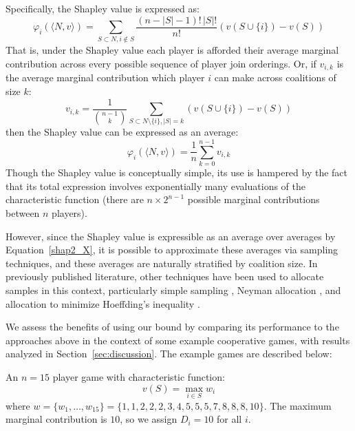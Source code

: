 Specifically, the Shapley value is expressed as:
\begin{equation}\label{shap1_X}\varphi_i(\langle N,v\rangle) = \sum_{S\subset N, i\notin S}\frac{(n-|S|-1)!\,|S|!}{n!}(v(S\cup\{i\})-v(S))\end{equation}
That is, under the Shapley value each player is afforded their average marginal contribution across every possible sequence of player join orderings.  
Or, if $v_{i,k}$ is the average marginal contribution which player $i$ can make across coalitions of size $k$:
\begin{equation}
v_{i,k} = \frac{1}{\binom{n-1}{k}}\sum_{S\subset N\setminus \{ i\} , |S|=k} %
(v(S\cup\{i\})-v(S))
\end{equation}
then the Shapley value can be expressed as an average:
\begin{equation}\label{shap2_X} \varphi_i(\langle N,v\rangle) = \frac{1}{n}\sum_{k=0}^{n-1}v_{i,k} \end{equation}
Though the Shapley value is conceptually simple, its use is hampered by the fact that its total expression involves exponentially many evaluations of the characteristic function (there are $n\times 2^{n-1}$ possible marginal contributions between $n$ players).

However, since the Shapley value is expressible as an average over averages by Equation~\eqref{shap2_X}, 
it is possible to approximate these averages via sampling techniques, and these averages are naturally stratified by coalition size.
In previously published literature, other techniques have been used to allocate samples in this context, particularly simple sampling \citep{DBLP:journals/cor/CastroGT09}, Neyman allocation \citep{CASTRO2017180,DBLP:journals/tsg/OBrienGR15}, and allocation to minimize Hoeffding's inequality \citep{2013arXiv1306.4265M}.

We assess the benefits of using our bound by comparing its performance to the approaches above in the context of some example cooperative games, with results analyzed in Section~\ref{sec:discussion}.
The example games are described below:

\begin{example_game}
An $n=15$ player game with characteristic function:
$$v(S)=\max_{i\in S}w_i$$
where
$w=\{w_1,\dots,w_{15}\} %
=\{ 1, 1, 2, 2, 2, 3, 4, 5, 5, 5, 7, 8, 8, 8, 10\}$.
The maximum marginal contribution is $10$, so we assign $D_i=10$ for all $i$.
\end{example_game}

